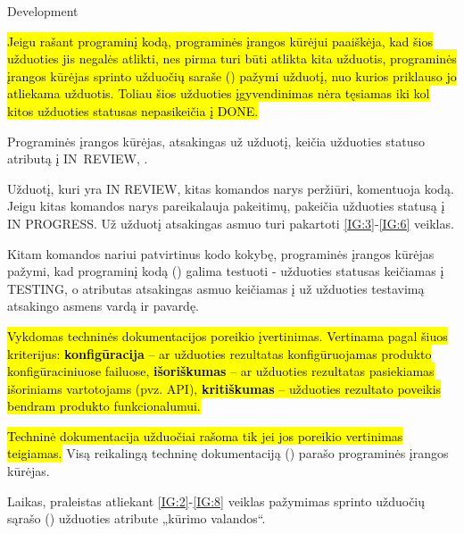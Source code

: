 \begin{processTable}{Development}
{        \item \hl{Jeigu rašant programinį kodą, programinės įrangos kūrėjui paaiškėja, kad šios užduoties jis negalės atlikti, nes pirma turi būti atlikta kita užduotis, programinės įrangos kūrėjas sprinto užduočių saraše () pažymi užduotį, nuo kurios priklauso jo atliekama užduotis. Toliau šios užduoties įgyvendinimas nėra tęsiamas iki kol kitos užduoties statusas nepasikeičia į DONE.}
        \label{IG:3}

        \item Programinės įrangos kūrėjas, atsakingas už užduotį, keičia užduoties statuso atributą į \mbox{IN~REVIEW}, .
        \label{IG:5}

        \item Užduotį, kuri yra IN REVIEW, kitas komandos narys peržiūri, komentuoja kodą. Jeigu kitas komandos narys pareikalauja pakeitimų, pakeičia užduoties statusą į IN PROGRESS. Už užduotį atsakingas asmuo turi pakartoti \ref{IG:3}-\ref{IG:6} veiklas.
        \label{IG:6}
        \item Kitam komandos nariui patvirtinus kodo kokybę, programinės įrangos kūrėjas pažymi, kad programinį kodą () galima testuoti - užduoties statusas keičiamas į TESTING, o atributas atsakingas asmuo  keičiamas į už užduoties testavimą atsakingo asmens vardą ir pavardę.  
        \label{IG:7}

        \item \hl{Vykdomas techninės dokumentacijos poreikio įvertinimas. Vertinama pagal šiuos kriterijus: \textbf{konfigūracija} -- ar užduoties rezultatas konfigūruojamas produkto konfigūraciniuose failuose, \textbf{išoriškumas} -- ar užduoties rezultatas pasiekiamas išoriniams vartotojams (pvz. API), \textbf{kritiškumas} -- užduoties rezultato poveikis bendram produkto funkcionalumui.}

        \item \hl{Techninė dokumentacija užduočiai rašoma tik jei jos poreikio vertinimas teigiamas.} Visą reikalingą techninę dokumentaciją () parašo programinės įrangos kūrėjas.
        \label{IG:8}

        \item Laikas, praleistas atliekant \ref{IG:2}-\ref{IG:8} veiklas pažymimas sprinto užduočių sąrašo ()  užduoties atribute  „kūrimo valandos“.
    }
\end{processTable}

